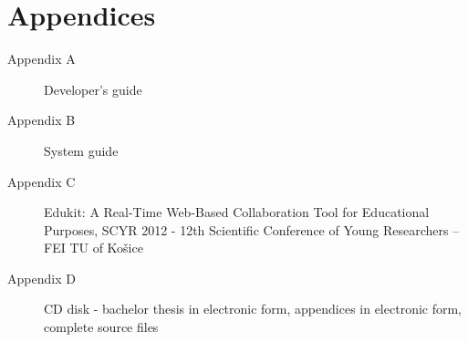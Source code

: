 \section*{Appendices}
\thispagestyle{empty}

\begin{description}
	\item[Appendix A] Developer's guide
	\item[Appendix B] System guide
	\item[Appendix C] Edukit: A Real-Time Web-Based Collaboration Tool for Educational Purposes, SCYR 2012 - 12th Scientific Conference of Young Researchers – FEI TU of Košice
	\item[Appendix D] CD disk - bachelor thesis in electronic form, appendices in electronic form, complete source files
\end{description}